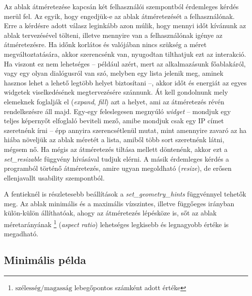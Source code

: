 Az ablak átméretezése kapcsán két felhasználói szempontból érdemleges kérdés merül fel. Az egyik, hogy engedjük-e az ablak átméretezését a felhasználónak. Erre a kérdésre adott válasz leginkább azon múlik, hogy mennyi időt kívánunk az ablak tervezésével tölteni, illetve mennyire van a felhasználónak igénye az átméretezésre. Ha időnk korlátos és valójában nincs szükség a méret megváltoztatására, akkor szerencsénk van, nyugodtan tilthatjuk ezt az interakció. Ha viszont ez nem lehetséges -- például azért, mert az alkalmazásunk főablakáról, vagy egy olyan dialógusról van szó, melyben egy lista jelenik meg, aminek hasznos lehet a lehető legtöbb helyet biztosítani --, akkor időt és energiát az egyes widgetek viselkedésének megtervezésére szánnunk. Át kell gondolnunk mely elemeknek foglalják el (\textit{expand}, \textit{fill}) azt a helyet, ami az átméretezés révén rendelkezésre áll majd. Egy-egy feleslegesen megnyúló \textit{widget} -- mondjuk egy teljes képernyőt elfoglaló beviteli mező, amibe mondjuk csak egy IP címet szeretnénk írni -- épp annyira szerencsétlenül mutat, mint amennyire zavaró az ha hiába növeljük az ablak méretét a lista, amiből több sort szeretnénk látni, mégsem nő. Ha mégis az átméretezés tiltása mellett döntenénk, akkor ezt a \textit{set\_resizable} függvény hívásával tudjuk elérni. A másik érdemleges kérdés a programból történő átméretezés, amire ugyan megoldható (\textit{resize}), de erősen ellenjavallt usability szempontból.
 
A fentieknél is részletesebb beállítások a \textit{set\_geometry\_hints} függvénnyel tehetők meg. Az ablak minimális és a maximális vízszintes, illetve függőeges irányban külön-külön állíthatóak, ahogy az átméretezés lépésköze is, sőt az ablak méretarányának \footnote{$\mbox{szélesség} / \mbox{magasság}$ lebegőpontos számként adott értéke} (\textit{aspect ratio}) lehetséges legkisebb és legnagyobb értéke is megadható.

\subsection{Minimális példa}

